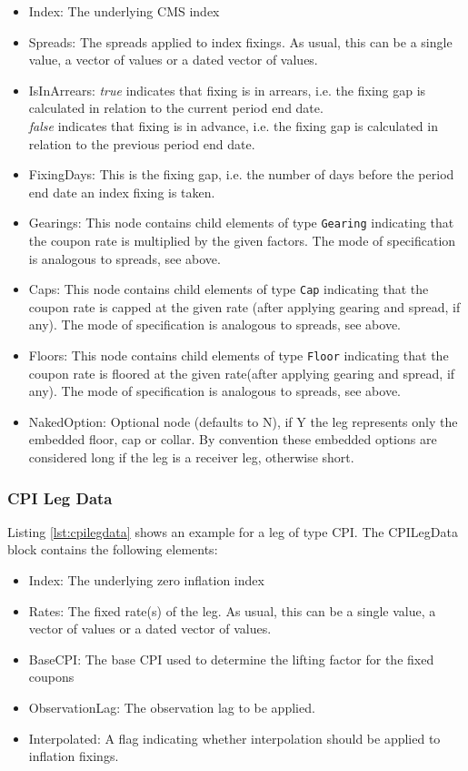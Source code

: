 \begin{itemize}
\item Index: The underlying CMS index
\item Spreads: The spreads applied to index fixings. As usual, this can be a single value, a vector of values or a dated vector of
  values.
\item IsInArrears:  \emph{true} indicates that  fixing is in arrears,
  i.e. the fixing gap is calculated in relation to the current period
  end date.\\ \emph{false} indicates that  fixing is in advance,
  i.e. the fixing gap is calculated in relation to the previous period
  end date.  
\item FixingDays: This is the fixing gap, i.e. the number of days
  before the period end date an index fixing is taken.   
\item Gearings: This node contains child elements of type \lstinline!Gearing! indicating that the coupon rate is
  multiplied by the given factors. The mode of specification is analogous to spreads, see above.
\item Caps: This node contains child elements of type \lstinline!Cap! indicating that the coupon rate is capped at the
  given rate (after applying gearing and spread, if any). The mode of specification is analogous to spreads, see above.
\item Floors: This node contains child elements of type \lstinline!Floor! indicating that the coupon rate is floored at
  the given rate(after applying gearing and spread, if any). The mode of specification is analogous to spreads, see
  above.
\item NakedOption: Optional node (defaults to N), if Y the leg represents only the embedded floor, cap or collar. 
By convention these embedded options are considered long if the leg is a receiver leg, otherwise short. 
\end{itemize}

\subsubsection{CPI Leg Data}
\label{ss:cpilegdata}

Listing \ref{lst:cpilegdata} shows an example for a leg of type CPI. The CPILegData block contains the following
elements:

\begin{itemize}
\item Index: The underlying zero inflation index
\item Rates: The fixed rate(s) of the leg. As usual, this can be a single value, a vector of values or a dated vector of
  values.
\item BaseCPI: The base CPI used to determine the lifting factor for the fixed coupons
\item ObservationLag: The observation lag to be applied.
\item Interpolated: A flag indicating whether interpolation should be applied to inflation fixings.
\end{itemize}

